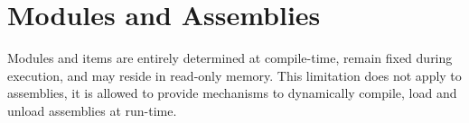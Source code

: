 \chapter{Modules and Assemblies}

Modules and items are entirely determined at compile-time, remain fixed during execution, and may reside in read-only memory. This limitation does not apply to assemblies, it is allowed to provide mechanisms to dynamically compile, load and unload assemblies at run-time.
